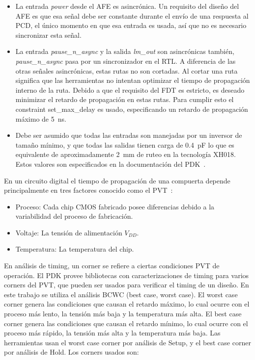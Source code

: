 \documentclass[a4paper, twoside, 11pt]{report}
\begin{document}
\begin{itemize}
  \item La entrada \textit{power} desde el AFE es asincrónica. Un requisito del diseño del AFE es que esa señal debe ser constante durante el envío de una respuesta al PCD, el único momento en que esa entrada es usada, así que no es necesario sincronizar esta señal.
  \item La entrada \textit{pause\_n\_async} y la salida \textit{lm\_out} son asincrónicas también, \textit{pause\_n\_async} pasa por un sincronizador en el RTL. A diferencia de las otras señales asincrónicas, estas rutas no son cortadas. Al cortar una ruta significa que las herramientas no intentan optimizar el tiempo de propagación interno de la ruta. Debido a que el requisito del FDT es estricto, es deseado minimizar el retardo de propagación en estas rutas. Para cumplir esto el constraint set\_max\_delay es usado, especificando un retardo de propagación máximo de \SI{5}{\nano\second}.
  \item Debe ser asumido que todas las entradas son manejadas por un inversor de tamaño mínimo, y que todas las salidas tienen carga de \SI{0.4}{\pico\farad} lo que es equivalente de aproximadamente \SI{2}{\milli\meter} de ruteo en la tecnología XH018. Estos valores son especificados en la documentación del PDK~\cite{dig_imp_guidelines}.
\end{itemize}

En un circuito digital el tiempo de propagación de una compuerta depende principalmente en tres factores conocido como el PVT~\cite{sta_for_nm_designs}:

\begin{itemize}
  \item Proceso: Cada chip CMOS fabricado posee diferencias debido a la variabilidad del proceso de fabricación.
  \item Voltaje: La tensión de alimentación $V_{DD}$.
  \item Temperatura: La temperatura del chip.
\end{itemize}

En análisis de timing, un corner se refiere a ciertas condiciones PVT de operación. El PDK provee bibliotecas con caracterizaciones de timing para varios corners del PVT, que pueden ser usados para verificar el timing de un diseño. En este trabajo se utiliza el análisis BCWC (best case, worst case). El worst case corner genera las condiciones que causan el retardo máximo, lo cual ocurre con el proceso más lento, la tensión más baja y la temperatura más alta. El best case corner genera las condiciones que causan el retardo mínimo, lo cual ocurre con el proceso más rápido, la tensión más alta y la temperatura más baja. Las herramientas usan el worst case corner por análisis de Setup, y el best case corner por análisis de Hold. Los corners usados son:
\end{document}
